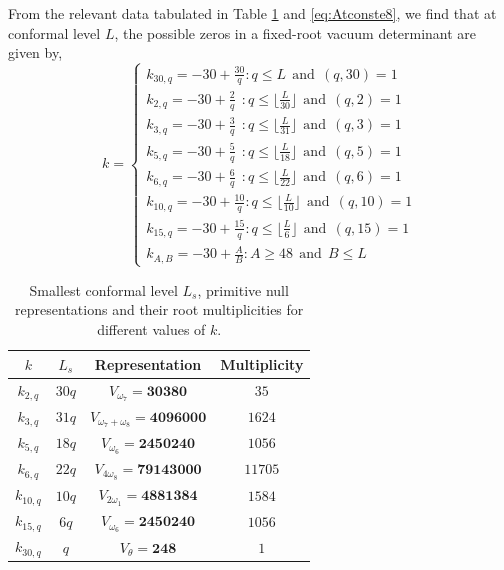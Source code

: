 From the relevant data tabulated in Table \ref{tb:e8zerodata} and \eqref{eq:Atconste8}, we find that at conformal level $L$, the possible zeros in a fixed-root vacuum determinant are given by,
\begin{equation} \label{eq: e8prelimzero}
    k = \begin{cases}
        k_{30,q} = -30 + \frac{30}{q}: q \leqslant L \ \ \text{and} \ \ (q,30)=1 \\ 
        k_{2,q} = -30 + \frac{2}{q} \ \ : q \leqslant \lfloor \frac{L}{30} \rfloor \ \ \text{and} \ \ (q,2)=1 \\
        k_{3,q} = -30 + \frac{3}{q} \ \ : q \leqslant \lfloor \frac{L}{31} \rfloor \ \ \text{and} \ \ (q,3)=1 \\
        k_{5,q} = -30 + \frac{5}{q} \ \ : q \leqslant \lfloor \frac{L}{18} \rfloor \ \ \text{and} \ \ (q,5)=1 \\
        k_{6,q} = -30 + \frac{6}{q} \ \ : q \leqslant \lfloor \frac{L}{22} \rfloor \ \ \text{and} \ \ (q,6)=1 \\
        k_{10,q} = -30 + \frac{10}{q} : q \leqslant \lfloor \frac{L}{10} \rfloor \ \ \text{and} \ \ (q,10)=1 \\
        k_{15,q} = -30 + \frac{15}{q} : q \leqslant \lfloor \frac{L}{6} \rfloor \ \ \text{and} \ \ (q,15)=1 \\
        k_{A,B} = -30 + \frac{A}{B} : A \geqslant 48 \ \ \text{and} \ \ B \leqslant L
    \end{cases}
\end{equation}
\begin{table}[]
    \centering
    \begin{tabular}{|c|c|c|c|}
        \hline\hline
        $k$ & $L_s$ & Representation & Multiplicity \\
        \hline\hline
        $k_{2,q}$  & $30q$ & $V_{\omega_7} = \textbf{30380}$ & $35$ \\
        $k_{3,q}$  & $31q$  & $V_{\omega_7+\omega_8} = \textbf{4096000}$ & $1624$ \\
        $k_{5,q}$  & $18q$ & $V_{\omega_6} = \textbf{2450240}$ & $1056$ \\
        $k_{6,q}$  & $22q$  & $V_{4\omega_8} = \textbf{79143000}$ & $11705$ \\
        $k_{10,q}$ & $10q$   & $V_{2\omega_1} = \textbf{4881384}$ & $1584$ \\
        $k_{15,q}$ & $6q$   & $V_{\omega_6} = \textbf{2450240}$ & $1056$ \\
        $k_{30,q}$ & $q$   & $V_\theta = \textbf{248}$ & $1$ \\
        \hline
    \end{tabular}
    \caption{\label{tb:e8zerodata} Smallest conformal level $L_s$, primitive null representations and their root multiplicities for different values of $k$.}
\end{table}

